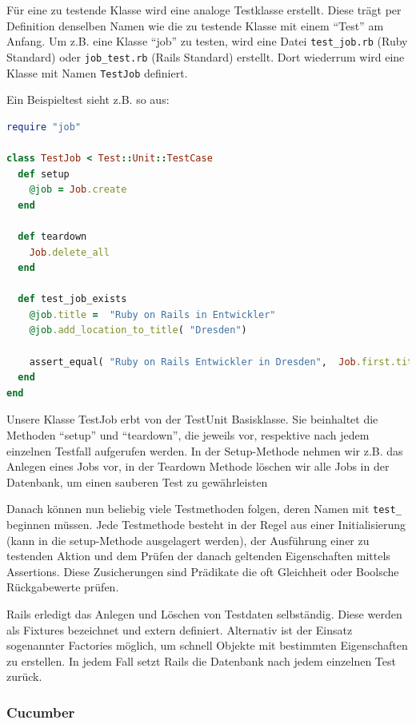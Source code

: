 Für eine zu testende Klasse wird eine analoge Testklasse erstellt. Diese trägt per Definition denselben Namen wie die zu testende Klasse mit einem "`Test"' am Anfang. Um z.B. eine Klasse "`job"' zu testen, wird eine Datei \texttt{test\_job.rb} (Ruby Standard) oder \texttt{job\_test.rb} (Rails Standard) erstellt. Dort wiederrum wird eine Klasse mit Namen \texttt{TestJob} definiert. 

Ein Beispieltest sieht z.B. so aus:
\begin{lstlisting}[language=Ruby,label=Testen mit Test::Unit,caption=Testen mit Test::Unit in Ruby]
require "job"

class TestJob < Test::Unit::TestCase
  def setup
    @job = Job.create
  end
  
  def teardown
    Job.delete_all
  end
  
  def test_job_exists
    @job.title =  "Ruby on Rails in Entwickler"
    @job.add_location_to_title( "Dresden")
    
    assert_equal( "Ruby on Rails Entwickler in Dresden",  Job.first.title)
  end
end
\end{lstlisting}
Unsere Klasse TestJob erbt von der TestUnit Basisklasse. Sie beinhaltet die Methoden "`setup"' und "`teardown"', die jeweils vor, respektive nach jedem einzelnen Testfall aufgerufen werden.
In der Setup-Methode nehmen wir z.B. das Anlegen eines Jobs vor, in der Teardown Methode löschen wir alle Jobs in der Datenbank, um einen sauberen Test zu gewährleisten

Danach können nun beliebig viele Testmethoden folgen, deren Namen mit \texttt{test\_} beginnen müssen.
Jede Testmethode besteht in der Regel aus einer Initialisierung (kann in die setup-Methode ausgelagert werden), der Ausführung einer zu testenden Aktion und dem Prüfen der danach geltenden Eigenschaften mittels Assertions. Diese Zusicherungen sind Prädikate die oft Gleichheit oder Boolsche Rückgabewerte prüfen.


Rails erledigt das Anlegen und Löschen von Testdaten selbständig. Diese werden als Fixtures bezeichnet und extern definiert. Alternativ ist der Einsatz sogenannter Factories möglich, um schnell Objekte mit bestimmten Eigenschaften zu erstellen. In jedem Fall setzt Rails die Datenbank nach jedem einzelnen Test zurück.


\subsubsection{Cucumber}

